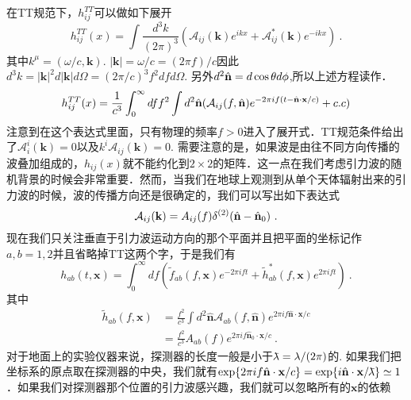 在TT规范下，$h^{TT}_{ij}$可以做如下展开
\begin{equation}
h^{TT}_{ij}(x) = \int \frac{d^3 k}{(2\pi)^3} (\mathcal A_{ij}(\mathbf k) e^{ikx} + \mathcal A_{ij}^* (\mathbf k) e^{-i k x} ) ~. 
\end{equation}
其中$k^\mu = (\omega/c,\mathbf k)$. $|\mathbf k| = \omega/c = (2\pi f)/c$因此$d^3 k = |\mathbf k|^2 d|\mathbf k| d\Omega = (2\pi/c)^3 f^2 df d\Omega $. 另外$d^2\hat{\bf{n}} = d\cos\theta d\phi$,所以上述方程读作．
\begin{equation}\label{TTGaug_eq4}
h^{TT}_{ij}(x) = \frac{1}{c^3} \int^\infty_0 df f^2 \int d^2 \hat{ \bf{n} } ( \mathcal A_{ij} (f,\hat{ \bf{n} }) e^{-2\pi i f(t-\hat{ {\bf n} } \cdot {\bf x} /c  )}  + {c.c} ) 
\end{equation}
注意到在这个表达式里面，只有物理的频率$f>0$进入了展开式．TT规范条件给出了$\mathcal A^i_i (\mathbf k) =0 $以及$k^i \mathcal A_{ij} (\mathbf k) =0 $. 需要注意的是，如果波是由往不同方向传播的波叠加组成的，$h_{ij}(x)$就不能约化到$2\times 2$的矩阵．这一点在我们考虑引力波的随机背景的时候会非常重要．然而，当我们在地球上观测到从单个天体辐射出来的引力波的时候，波的传播方向还是很确定的，我们可以写出如下表达式
\begin{equation}
\mathcal A_{ij} (\mathbf k) = A_{ij} (f) \delta^{(2)} (\hat{  \mathbf n } - \hat{ {\bf n} }_0 )~.
\end{equation}
现在我们只关注垂直于引力波运动方向的那个平面并且把平面的坐标记作$a,b = 1,2$并且省略掉TT这两个字，于是我们有
\begin{equation}
h_{ab} (t,\mathbf x ) = \int^\infty_0 df ( \tilde f_{ab} (f,\mathbf x) e^{-2\pi i f t} + \tilde h^*_{ab} (f,\mathbf x) e^{2\pi i f t} ) ~. 
\end{equation}
其中
\begin{equation}
\begin{aligned}
\tilde h_{ab} (f,\mathbf x) & = \frac{f^2}{c^3} \int d^2 \hat{  \mathbf n } \mathcal A_{ab} (f, \hat{\mathbf{n}}) e^{2\pi i f \hat{  \mathbf n } \cdot \mathbf x / c  } \\
& = \frac{f^2}{c^3} A_{ab} (f) e^{2\pi i f {\hat{\mathbf n}_0 \cdot \mathbf x /c  } }~.
\end{aligned}
\end{equation} 
对于地面上的实验仪器来说，探测器的长度一般是小于${\mkern0.7mu {\bar{\phantom{a}}} \mkern -11mu\lambda} = \lambda/(2\pi)$的. 如果我们把坐标系的原点取在探测器的中央，我们就有$\exp  \{   2\pi i f \hat{ \mathbf n } \cdot \mathbf x/c \} = \exp \{ i \hat{ {\bf n} } \cdot \mathbf x / {\mkern0.75mu {\bar{\phantom{a}}} \mkern -11.75mu\lambda} \} \simeq 1  $．如果我们对探测器那个位置的引力波感兴趣，我们就可以忽略所有的$\mathbf x$的依赖
